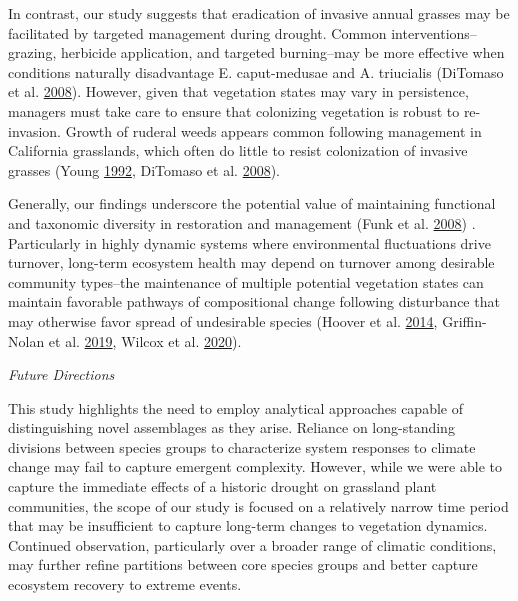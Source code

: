 \documentclass[twoside,12pt,final]{ucthesis-CA2012}
\begin{document}
\begin{ucmainmatter}
In contrast, our study suggests that eradication of invasive annual grasses may be facilitated by targeted management during drought.
Common interventions--grazing, herbicide application, and targeted burning--may be more effective when conditions naturally disadvantage E. caput-medusae and A. triucialis (DiTomaso et al. \protect\hyperlink{ref-DiTomaso2008}{2008}).
However, given that vegetation states may vary in persistence, managers must take care to ensure that colonizing vegetation is robust to re-invasion.
Growth of ruderal weeds appears common following management in California grasslands, which often do little to resist colonization of invasive grasses (Young \protect\hyperlink{ref-Young1992}{1992}, DiTomaso et al. \protect\hyperlink{ref-DiTomaso2008}{2008}).

Generally, our findings underscore the potential value of maintaining functional and taxonomic diversity in restoration and management (Funk et al. \protect\hyperlink{ref-Funk2008}{2008}) .
Particularly in highly dynamic systems where environmental fluctuations drive turnover, long-term ecosystem health may depend on turnover among desirable community types--the maintenance of multiple potential vegetation states can maintain favorable pathways of compositional change following disturbance that may otherwise favor spread of undesirable species (Hoover et al. \protect\hyperlink{ref-Hoover2014}{2014}, Griffin-Nolan et al. \protect\hyperlink{ref-Griffin-Nolan2019}{2019}, Wilcox et al. \protect\hyperlink{ref-Wilcox2020}{2020}).

\emph{Future Directions}

This study highlights the need to employ analytical approaches capable of distinguishing novel assemblages as they arise.
Reliance on long-standing divisions between species groups to characterize system responses to climate change may fail to capture emergent complexity.
However, while we were able to capture the immediate effects of a historic drought on grassland plant communities, the scope of our study is focused on a relatively narrow time period that may be insufficient to capture long-term changes to vegetation dynamics.
Continued observation, particularly over a broader range of climatic conditions, may further refine partitions between core species groups and better capture ecosystem recovery to extreme events.

\appendix

\hypertarget{chapter-1-supporting-information}{%
}
\end{ucmainmatter}
\end{document}
